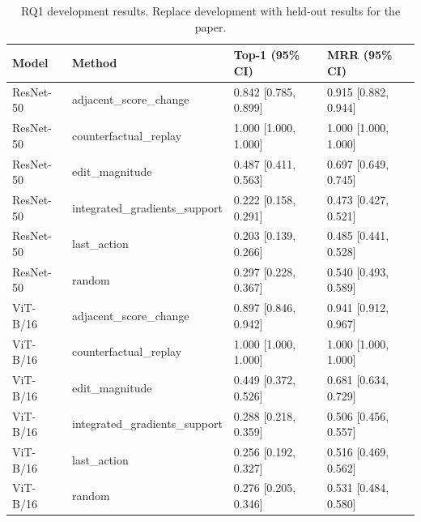 \begin{table}[t]
\centering
\caption{RQ1 development results. Replace development with held-out results for the paper.}
\label{tab:rq1}
\begin{tabular}{llll}
\toprule
Model & Method & Top-1 (95\% CI) & MRR (95\% CI) \\
\midrule
ResNet-50 & adjacent\_score\_change & 0.842 [0.785, 0.899] & 0.915 [0.882, 0.944] \\
ResNet-50 & counterfactual\_replay & 1.000 [1.000, 1.000] & 1.000 [1.000, 1.000] \\
ResNet-50 & edit\_magnitude & 0.487 [0.411, 0.563] & 0.697 [0.649, 0.745] \\
ResNet-50 & integrated\_gradients\_support & 0.222 [0.158, 0.291] & 0.473 [0.427, 0.521] \\
ResNet-50 & last\_action & 0.203 [0.139, 0.266] & 0.485 [0.441, 0.528] \\
ResNet-50 & random & 0.297 [0.228, 0.367] & 0.540 [0.493, 0.589] \\
ViT-B/16 & adjacent\_score\_change & 0.897 [0.846, 0.942] & 0.941 [0.912, 0.967] \\
ViT-B/16 & counterfactual\_replay & 1.000 [1.000, 1.000] & 1.000 [1.000, 1.000] \\
ViT-B/16 & edit\_magnitude & 0.449 [0.372, 0.526] & 0.681 [0.634, 0.729] \\
ViT-B/16 & integrated\_gradients\_support & 0.288 [0.218, 0.359] & 0.506 [0.456, 0.557] \\
ViT-B/16 & last\_action & 0.256 [0.192, 0.327] & 0.516 [0.469, 0.562] \\
ViT-B/16 & random & 0.276 [0.205, 0.346] & 0.531 [0.484, 0.580] \\
\bottomrule
\end{tabular}
\end{table}
